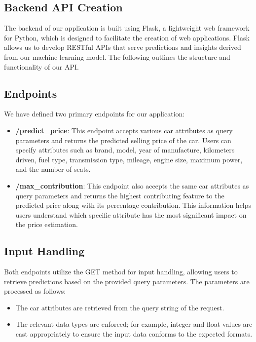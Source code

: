 \documentclass[a4paper,12pt]{article}
\begin{document}
\begin{justify}
\section{Backend API Creation}
The backend of our application is built using Flask, a lightweight web framework for Python, which is designed to facilitate the creation of web applications. Flask allows us to develop RESTful APIs that serve predictions and insights derived from our machine learning model. The following outlines the structure and functionality of our API.

\subsection{Endpoints}
We have defined two primary endpoints for our application:

\begin{itemize}
    \item \textbf{/predict\_price}: This endpoint accepts various car attributes as query parameters and returns the predicted selling price of the car. Users can specify attributes such as brand, model, year of manufacture, kilometers driven, fuel type, transmission type, mileage, engine size, maximum power, and the number of seats.
    
    \item \textbf{/max\_contribution}: This endpoint also accepts the same car attributes as query parameters and returns the highest contributing feature to the predicted price along with its percentage contribution. This information helps users understand which specific attribute has the most significant impact on the price estimation.
\end{itemize}

\subsection{Input Handling}
Both endpoints utilize the GET method for input handling, allowing users to retrieve predictions based on the provided query parameters. The parameters are processed as follows:

\begin{itemize}
    \item The car attributes are retrieved from the query string of the request.
    \item The relevant data types are enforced; for example, integer and float values are cast appropriately to ensure the input data conforms to the expected formats.
\end{itemize}


\end{justify}
\end{document}
